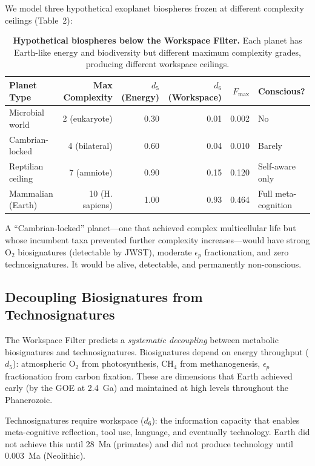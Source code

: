 \documentclass[10pt,letterpaper]{article}
\begin{document}
We model three hypothetical exoplanet biospheres frozen at different
complexity ceilings (Table~2):

\begin{table}[H]
\caption{{\bf Hypothetical biospheres below the Workspace Filter.}
Each planet has Earth-like energy and biodiversity but different maximum
complexity grades, producing different workspace ceilings.}
\begin{tabular}{lrrrrl}
\toprule
Planet Type & Max Complexity & $d_5$ (Energy) & $d_6$ (Workspace) & $F_{\max}$ & Conscious? \\
\midrule
Microbial world & 2 (eukaryote) & 0.30 & 0.01 & 0.002 & No \\
Cambrian-locked & 4 (bilateral) & 0.60 & 0.04 & 0.010 & Barely \\
Reptilian ceiling & 7 (amniote) & 0.90 & 0.15 & 0.120 & Self-aware only \\
Mammalian (Earth) & 10 (H. sapiens) & 1.00 & 0.93 & 0.464 & Full meta-cognition \\
\bottomrule
\end{tabular}
\end{table}

A ``Cambrian-locked'' planet---one that achieved complex multicellular
life but whose incumbent taxa prevented further complexity increases---would
have strong $\text{O}_2$ biosignatures (detectable by JWST), moderate
$\epsilon_p$ fractionation, and zero technosignatures. It would be
alive, detectable, and permanently non-conscious.

\subsection*{Decoupling Biosignatures from Technosignatures}

The Workspace Filter predicts a \emph{systematic decoupling} between
metabolic biosignatures and technosignatures. Biosignatures depend on
energy throughput ($d_5$): atmospheric $\text{O}_2$ from photosynthesis,
$\text{CH}_4$ from methanogenesis, $\epsilon_p$ fractionation from
carbon fixation. These are dimensions that Earth achieved early
(by the GOE at 2.4~Ga) and maintained at high levels throughout the
Phanerozoic.

Technosignatures require workspace ($d_6$): the information capacity
that enables meta-cognitive reflection, tool use, language, and
eventually technology. Earth did not achieve this until 28~Ma (primates)
and did not produce technology until 0.003~Ma (Neolithic).
\end{document}
